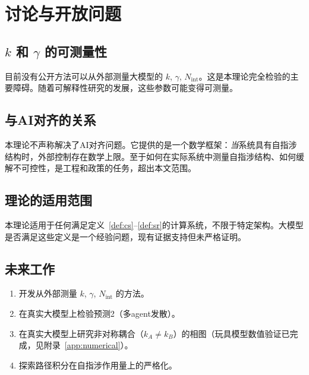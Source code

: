 \documentclass[12pt,a4paper]{article}
\theoremstyle{definition}
\newcommand{\Nint}{N_{\mathrm{int}}}
\begin{document}
\section{讨论与开放问题}
\label{sec:discussion}

\subsection{$k$ 和 $\gamma$ 的可测量性}

目前没有公开方法可以从外部测量大模型的 $k$, $\gamma$, $\Nint$。这是本理论完全检验的主要障碍。随着可解释性研究的发展，这些参数可能变得可测量。

\subsection{与AI对齐的关系}

本理论不声称解决了AI对齐问题。它提供的是一个数学框架：\emph{当}系统具有自指涉结构时，外部控制存在数学上限。至于如何在实际系统中测量自指涉结构、如何缓解不可控性，是工程和政策的任务，超出本文范围。

\subsection{理论的适用范围}

本理论适用于任何满足定义~\ref{def:cs}--\ref{def:sr}的计算系统，不限于特定架构。大模型是否满足这些定义是一个经验问题，现有证据支持但未严格证明。

\subsection{未来工作}

\begin{enumerate}[leftmargin=*]
\item 开发从外部测量 $k$, $\gamma$, $\Nint$ 的方法。
\item 在真实大模型上检验预测2（多agent发散）。
\item 在真实大模型上研究非对称耦合（$k_A \neq k_B$）的相图（玩具模型数值验证已完成，见附录~\ref{app:numerical}）。
\item 探索路径积分在自指涉作用量上的严格化。
\end{enumerate}
\end{document}
